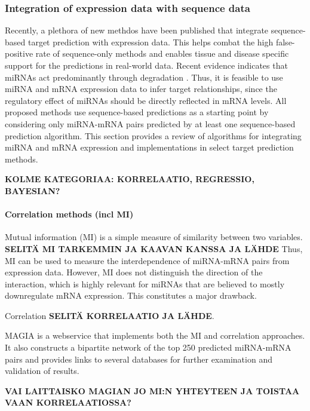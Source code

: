 \subsubsection{Integration of expression data with sequence data}\label
{integration-of-expression-data-with-sequence-data}

Recently, a plethora of new methdos have been published that integrate
sequence-based target prediction with expression data. This helps combat the
high false-positive rate of sequence-only methods and enables tissue and
disease specific support for the predictions in real-world data. Recent
evidence indicates that miRNAs act predominantly through degradation
\citep{CITE}. Thus, it is feasible to use miRNA and mRNA expression data to
infer target relationships, since the regulatory effect of miRNAs should be
directly reflected in mRNA levels. All proposed methods use sequence-based
predictions as a starting point by considering only miRNA-mRNA pairs predicted
by at least one sequence-based prediction algorithm. This section provides a
review of algorithms for integrating miRNA and mRNA expression and
implementations in select target prediction methods.

\textbf{KOLME KATEGORIAA: KORRELAATIO, REGRESSIO, BAYESIAN?}



\paragraph{Correlation methods (incl MI)}\label{correlation-methods}

Mutual information (MI) is a simple measure of similarity between two
variables. \textbf{SELITÄ MI TARKEMMIN JA KAAVAN KANSSA JA LÄHDE} Thus, MI can
be used to measure the interdependence of miRNA-mRNA pairs from expression
data. However, MI does not distinguish the direction of the interaction, which
is highly relevant for miRNAs that are believed to mostly downregulate mRNA
expression. This constitutes a major drawback.

Correlation \textbf{SELITÄ KORRELAATIO JA LÄHDE}.

MAGIA \citep{Sales2010} is a webservice that implements both the MI and
correlation approaches. It also constructs a bipartite network of the top 250
predicted miRNA-mRNA pairs and provides links to several databases for further
examination and validation of results.

\textbf{VAI LAITTAISKO MAGIAN JO MI:N YHTEYTEEN JA TOISTAA VAAN
KORRELAATIOSSA?}



